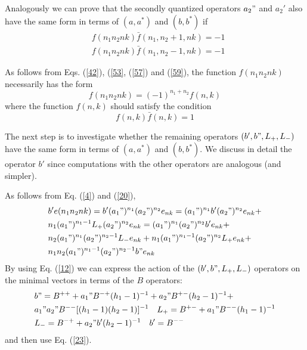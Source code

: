 \documentclass[a4paper,12pt]{article}%
\begin{document}
Analogously we can prove that the secondly quantized operators 
$a_2"$ and $a_2'$ also have the same form in terms of $(a,a^*)$
and $(b,b^*)$ if
\begin{eqnarray}
&f(n_1n_2nk){\bar f}(n_1,n_2+1,nk)=-1\nonumber\\ 
&f(n_1n_2nk){\bar f}(n_1,n_2-1,nk)=-1
\label{59}
\end{eqnarray} 

As follows from Eqs. (\ref{42}), (\ref{53}, (\ref{57}) and
(\ref{59}), the function $f(n_1n_2nk)$ necessarily has the
form
\begin{equation}
f(n_1n_2nk)=(-1)^{n_1+n_2}f(n,k)
\label{60}
\end{equation}
where the function $f(n,k)$ should satisfy the condition
\begin{equation}
f(n,k){\bar f}(n,k)=1
\label{61}
\end{equation}

The next step is to investigate whether the remaining 
operators $(b',b",L_+,L_-)$ have the same 
form in terms of $(a,a^*)$ and $(b,b^*)$. We discuss
in detail the operator $b'$ since computations with the
other operators are analogous (and simpler).

As follows from Eq. (\ref{4}) and (\ref{20}),
\begin{eqnarray}
&b'e(n_1n_2nk)=b'(a_1")^{n_1}(a_2")^{n_2}e_{nk}=
(a_1")^{n_1}b'(a_2")^{n_2}e_{nk}+\nonumber\\
&n_1(a_1")^{n_1-1}L_+(a_2")^{n_2}e_{nk}=
(a_1")^{n_1}(a_2")^{n_2}b'e_{nk}+\nonumber\\
&n_2(a_1")^{n_1}(a_2")^{n_2-1}L_-e_{nk}+
n_1(a_1")^{n_1-1}(a_2")^{n_2}L_+e_{nk}+\nonumber\\
&n_1n_2(a_1")^{n_1-1}(a_2")^{n_2-1}b"e_{nk}
\label{62}
\end{eqnarray}
By using Eq. (\ref{12}) we can express the action of
the $(b',b",L_+,L_-)$ operators on the minimal vectors
in terms of the $B$ operators:
\begin{eqnarray}
&b"=B^{++}+a_1"B^{-+}(h_1-1)^{-1}+a_2"B^{+-}(h_2-1)^{-1}+\nonumber\\
&a_1"a_2"B^{--}[(h_1-1)(h_2-1)]^{-1}\quad L_+=
B^{+-}+a_1"B^{--}(h_1-1)^{-1}\nonumber\\
&L_-=B^{-+}+a_2"b'(h_2-1)^{-1}\quad b'=B^{--}
\label{63}
\end{eqnarray}
and then use Eq. (\ref{23}). 
\end{document}
